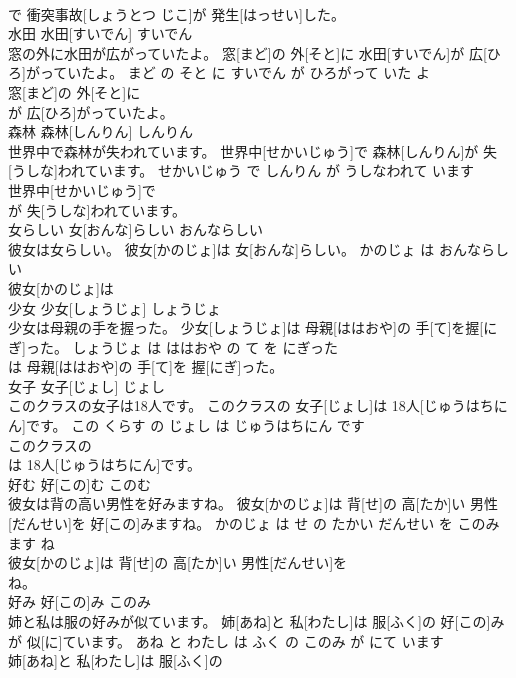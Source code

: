 \documentclass[8pt]{extreport}
\begin{document}
\begin{CJK}{UTF8}{min}
\\	で 衝突事故[しょうとつ じこ]が 発生[はっせい]した。			
\\	水田	水田[すいでん]	すいでん	
\\	窓の外に水田が広がっていたよ。	窓[まど]の 外[そと]に 水田[すいでん]が 広[ひろ]がっていたよ。	まど の そと に すいでん が ひろがって いた よ	
\\	窓[まど]の 外[そと]に
\\	が 広[ひろ]がっていたよ。			
\\	森林	森林[しんりん]	しんりん	
\\	世界中で森林が失われています。	世界中[せかいじゅう]で 森林[しんりん]が 失[うしな]われています。	せかいじゅう で しんりん が うしなわれて います	
\\	世界中[せかいじゅう]で
\\	が 失[うしな]われています。			
\\	女らしい	女[おんな]らしい	おんならしい	
\\	彼女は女らしい。	彼女[かのじょ]は 女[おんな]らしい。	かのじょ は おんならしい	
\\	彼女[かのじょ]は
\\	少女	少女[しょうじょ]	しょうじょ	
\\	少女は母親の手を握った。	少女[しょうじょ]は 母親[ははおや]の 手[て]を握[にぎ]った。	しょうじょ は ははおや の て を にぎった	
\\	は 母親[ははおや]の 手[て]を 握[にぎ]った。			
\\	女子	女子[じょし]	じょし	
\\	このクラスの女子は18人です。	このクラスの 女子[じょし]は 18人[じゅうはちにん]です。	この くらす の じょし は じゅうはちにん です	
\\	このクラスの
\\	は 18人[じゅうはちにん]です。			
\\	好む	好[この]む	このむ	
\\	彼女は背の高い男性を好みますね。	彼女[かのじょ]は 背[せ]の 高[たか]い 男性[だんせい]を 好[この]みますね。	かのじょ は せ の たかい だんせい を このみます ね	
\\	彼女[かのじょ]は 背[せ]の 高[たか]い 男性[だんせい]を
\\	ね。			
\\	好み	好[この]み	このみ	
\\	姉と私は服の好みが似ています。	姉[あね]と 私[わたし]は 服[ふく]の 好[この]みが 似[に]ています。	あね と わたし は ふく の このみ が にて います	
\\	姉[あね]と 私[わたし]は 服[ふく]の

\end{CJK}
\end{document}
